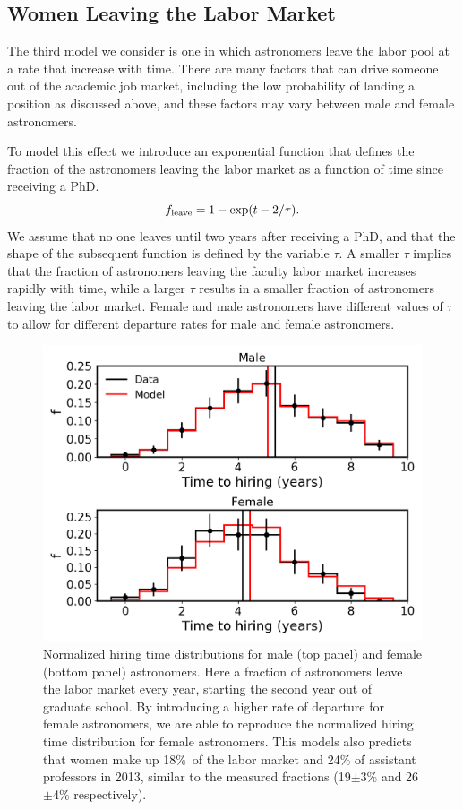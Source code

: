 \documentclass[modern]{aastex62}
\begin{document}
\subsection{Women Leaving the Labor Market}
The third model we consider is one in which astronomers leave the labor pool at a rate that increase with time. There are many factors that can drive someone out of the academic job market, including the low probability of landing a position as discussed above, and these factors may vary between male and female astronomers.

To model this effect we introduce an exponential function that defines the fraction of the astronomers leaving the labor market as a function of time since receiving a PhD.
\begin{equation}
f_{\rm leave} = 1-\exp (t-2/\tau).
\end{equation}
We assume that no one leaves until two years after receiving a PhD, and that the shape of the subsequent function is defined by the variable $\tau$. A smaller $\tau$ implies that the fraction of astronomers leaving the faculty labor market increases rapidly with time, while a larger $\tau$ results in a smaller fraction of astronomers leaving the labor market. Female and male astronomers have different values of $\tau$ to allow for different departure rates for male and female astronomers. 

\begin{figure}[!hbt]
\center
\includegraphics[scale=.6]{model3.png}
\caption{Normalized hiring time distributions for male (top panel) and female (bottom panel) astronomers. Here a fraction of astronomers leave the labor market every year, starting the second year out of graduate school. By introducing a higher rate of departure for female astronomers, we are able to reproduce the normalized hiring time distribution for female astronomers. This models also predicts that women make up 18\%\ of the labor market and 24\% of assistant professors in 2013, similar to the measured fractions (19$\pm$3\% and 26$\pm$4\% respectively).  \label{model3}}
\end{figure}
\end{document}
